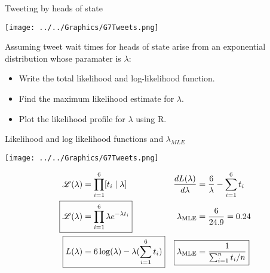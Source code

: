 \documentclass[ignorenonframetext,]{beamer}
\providecommand{\tightlist}{%
  \setlength{\itemsep}{0pt}\setlength{\parskip}{0pt}}
\begin{document}
\begin{frame}{Tweeting by heads of state\footnotemark}

\centerline{\texttt{[image: ../../Graphics/G7Tweets.png]}}

Assuming tweet wait times for heads of state arise from an exponential
distribution whose paramater is \(\lambda\):

\begin{itemize}
\tightlist
\item
  Write the total likelihood and log-likelihood function.
\item
   Find the maximum likelihood estimate for
  \(\lambda\).
\item
  Plot the likelihood profile for \(\lambda\) using R.
\end{itemize}

\bigskip


\end{frame}

\begin{frame}{Likelihood and log likelihood functions and
\(\lambda_{MLE}\)\footnotemark}

\centerline{\texttt{[image: ../../Graphics/G7Tweets.png]}}

\vspace*{-1cm}

\begin{align*}
\mathscr{L}(\lambda) & = \prod_{i=1}^{6}[t_{i} \mid \lambda] & \frac{dL(\lambda)}{d\lambda}& = \frac{6}{\lambda}-\sum_{i=1}^{6}t_{i}\\
\Aboxed{\mathscr{L}(\lambda) & = \prod_{i=1}^{6}\lambda e^{-\lambda{t_{i}}}} & \lambda_{\textrm{MLE}} & =\frac{6}{24.9}= 0.24\\
\Aboxed{L(\lambda) & = 6\log(\lambda)-\lambda{(\sum_{i=1}^{6}t_{i})}} & \Aboxed{{\lambda_{\textrm{MLE}}} & =\frac{1}{\sum_{i=1}^{n}t_{i}/n}}
\end{align*}

\end{frame}
\end{document}

